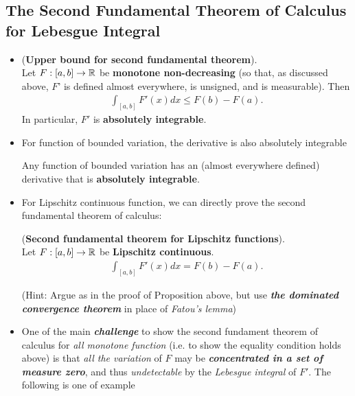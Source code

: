 \documentclass[11pt]{article}
\begin{document}
\subsection{The Second Fundamental Theorem of Calculus for Lebesgue Integral}
\begin{itemize}
\item \begin{proposition} (\textbf{Upper bound for second fundamental theorem}). \\
Let $F: [a, b] \rightarrow {\mathbb R}$ be \textbf{monotone non-decreasing} (so that, as discussed above, $F$' is defined almost everywhere, is unsigned, and is
measurable). Then
\begin{align*}
\int_{[a, b]}F'(x) dx \le F(b) - F(a).
\end{align*} In particular, $F'$ is \textbf{absolutely integrable}.
\end{proposition}

\item For function of bounded variation, the derivative is also absolutely integrable
\begin{proposition}
Any function of bounded variation has an (almost everywhere defined) derivative that is \textbf{absolutely integrable}.
\end{proposition}

\item For Lipschitz continuous function, we can directly prove the second fundamental theorem of calculus:
\begin{theorem} (\textbf{Second fundamental theorem for Lipschitz functions}). \\
Let $F: [a, b] \rightarrow {\mathbb R}$ be \textbf{Lipschitz continuous}.\begin{align*}
\int_{[a, b]}F'(x) dx = F(b) - F(a).
\end{align*}
\end{theorem} (Hint: Argue as in the proof of Proposition above, but use \emph{\textbf{the dominated convergence theorem}}  in place of
\emph{Fatou’s lemma})

\item \begin{remark}
One of the main \emph{\textbf{challenge}} to show the second fundament theorem of calculus for \emph{all monotone function} (i.e. to show the equality condition  holds above) is that \emph{all the variation} of $F$ may be \textbf{\emph{concentrated in a set of measure zero}}, and thus \emph{undetectable} by the \emph{Lebesgue integral} of $F'$. The following is one of example
\end{remark}


\end{itemize}
\end{document}
